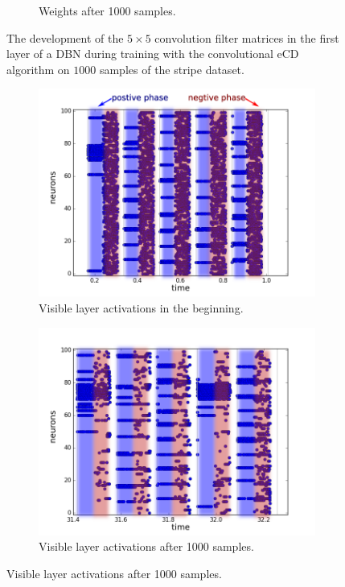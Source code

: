 \begin{figure}[h!]
\begin{subfigure}[t]{.4\textwidth}
  		\caption{Weights after 1000 samples.}
  		\label{fig:sub2}
	\end{subfigure}
	\caption{The development of the $5 \times 5$ convolution filter matrices in the first layer of a DBN during training with the convolutional eCD algorithm on $1000$ samples of the stripe dataset.}
	\label{fig:stripesdbnw}
\end{figure}



\begin{figure}[h!]
	\centering
	\begin{subfigure}[t]{.45\textwidth}
  		\centering
  		\includegraphics[width=.9\linewidth]{imgs/7x7/00006_v.png}
  		\caption{Visible layer activations in the beginning.}
  		\label{fig:sub1}
	\end{subfigure}%
	\begin{subfigure}[t]{.45\textwidth}
  		\centering
  		\includegraphics[width=.9\linewidth]{imgs/7x7/01992_v.png}
  		\caption{Visible layer  activations after 1000 samples.}
  		\label{fig:sub2}
	\end{subfigure}
	

\end{figure}
